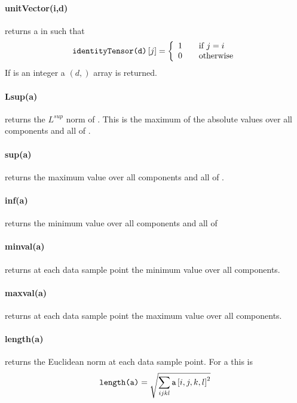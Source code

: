 \paragraph{unitVector(i,d)}
returns a \RankOne in \FunctionSpace {} such that
\begin{equation}
\code{identityTensor(d)}\left[ j \right] = \left\{
\begin{array}{l l}
    1 & \quad \text{if $j=i$}\\
    0 & \quad \text{otherwise}
\end{array}
\right.
\end{equation}
If  is an integer a $(d,)$ \numpy array is returned.


\paragraph{Lsup(a)}
returns the $L^{sup}$ norm of . This is the maximum of the absolute
values over all components and all \DataSamplePoints of .


\paragraph{sup(a)}
returns the maximum value over all components and all \DataSamplePoints of .


\paragraph{inf(a)}
returns the minimum value over all components and all \DataSamplePoints of 


\paragraph{minval(a)}
returns at each data sample point the minimum value over all components.


\paragraph{maxval(a)}
returns at each data sample point the maximum value over all components.


\paragraph{length(a)}
returns the Euclidean norm at each data sample point.
For a \RankFour {} this is
\begin{equation}
\code{length(a)}=\sqrt{\sum_{ijkl} \var{a} \left[i,j,k,l\right]^2}
\end{equation}


